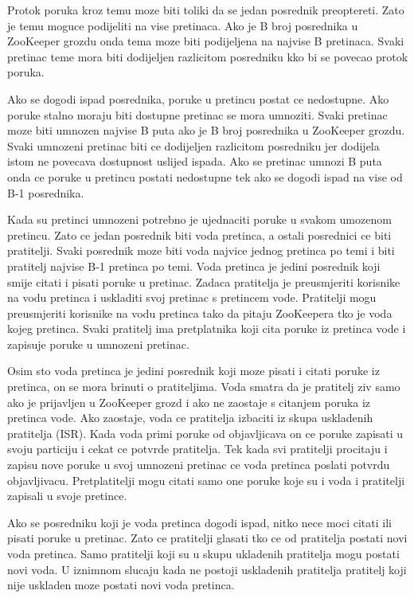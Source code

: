 \documentclass[times, utf8, diplomski, numeric]{fer}
\begin{document}
Protok poruka kroz temu moze biti toliki da se jedan posrednik preoptereti. Zato je temu moguce podijeliti na vise pretinaca. Ako je B broj posrednika u ZooKeeper grozdu onda tema moze biti podijeljena na najvise B pretinaca. Svaki pretinac teme mora biti dodijeljen razlicitom posredniku kko bi se povecao protok poruka.

Ako se dogodi ispad posrednika, poruke u pretincu postat ce nedostupne. Ako poruke stalno moraju biti dostupne pretinac se mora umnoziti. Svaki pretinac moze biti umnozen najvise B puta ako je B broj posrednika u ZooKeeper grozdu. Svaki umnozeni pretinac biti ce dodijeljen razlicitom posredniku jer dodijela istom ne povecava dostupnost uslijed ispada. Ako se pretinac umnozi B puta onda ce poruke u pretincu postati nedostupne tek ako se dogodi ispad na vise od B-1 posrednika.

Kada su pretinci umnozeni potrebno je ujednaciti poruke u svakom umozenom pretincu. Zato ce jedan posrednik biti voda pretinca, a ostali posrednici ce biti pratitelji. Svaki posrednik moze biti voda najvice jednog pretinca po temi i biti pratitelj najvise B-1 pretinca po temi. Voda pretinca je jedini posrednik koji smije citati i pisati poruke u pretinac. Zadaca pratitelja je preusmjeriti korisnike na vodu pretinca i uskladiti svoj pretinac s pretincem vode. Pratitelji mogu preusmjeriti korisnike na vodu pretinca tako da pitaju ZooKeepera tko je voda kojeg pretinca. Svaki pratitelj ima pretplatnika koji cita poruke iz pretinca vode i zapisuje poruke u umnozeni pretinac.

Osim sto voda pretinca je jedini posrednik koji moze pisati i citati poruke iz pretinca, on se mora brinuti o pratiteljima. Voda smatra da je pratitelj ziv samo ako je prijavljen u ZooKeeper grozd i ako ne zaostaje s citanjem poruka iz pretinca vode. Ako zaostaje, voda ce pratitelja izbaciti iz skupa uskladenih pratitelja (ISR). Kada voda primi poruke od objavljicava on ce poruke zapisati u svoju particiju i cekat ce potvrde pratitelja. Tek kada svi pratitelji procitaju i zapisu nove poruke u svoj umnozeni pretinac ce voda pretinca poslati potvrdu objavljivacu. Pretplatitelji mogu citati samo one poruke koje su i voda i pratitelji zapisali u svoje pretince.

Ako se posredniku koji je voda pretinca dogodi ispad, nitko nece moci citati ili pisati poruke u pretinac. Zato ce pratitelji glasati tko ce od pratitelja postati novi voda pretinca. Samo pratitelji koji su u skupu ukladenih pratitelja mogu postati novi voda. U iznimnom slucaju kada ne postoji uskladenih pratitelja pratitelj koji nije uskladen moze postati novi voda pretinca.
\end{document}
